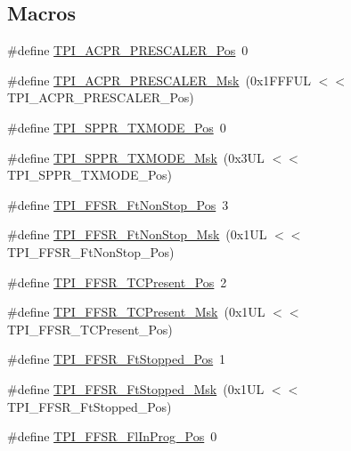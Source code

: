 \subsection*{Macros}
\begin{DoxyCompactItemize}
\item 
\#define \hyperlink{group__CMSIS__TPI_ga5a82d274eb2df8b0c92dd4ed63535928}{T\-P\-I\-\_\-\-A\-C\-P\-R\-\_\-\-P\-R\-E\-S\-C\-A\-L\-E\-R\-\_\-\-Pos}~0
\item 
\#define \hyperlink{group__CMSIS__TPI_ga4fcacd27208419929921aec8457a8c13}{T\-P\-I\-\_\-\-A\-C\-P\-R\-\_\-\-P\-R\-E\-S\-C\-A\-L\-E\-R\-\_\-\-Msk}~(0x1\-F\-F\-F\-U\-L $<$$<$ T\-P\-I\-\_\-\-A\-C\-P\-R\-\_\-\-P\-R\-E\-S\-C\-A\-L\-E\-R\-\_\-\-Pos)
\item 
\#define \hyperlink{group__CMSIS__TPI_ga0f302797b94bb2da24052082ab630858}{T\-P\-I\-\_\-\-S\-P\-P\-R\-\_\-\-T\-X\-M\-O\-D\-E\-\_\-\-Pos}~0
\item 
\#define \hyperlink{group__CMSIS__TPI_gaca085c8a954393d70dbd7240bb02cc1f}{T\-P\-I\-\_\-\-S\-P\-P\-R\-\_\-\-T\-X\-M\-O\-D\-E\-\_\-\-Msk}~(0x3\-U\-L $<$$<$ T\-P\-I\-\_\-\-S\-P\-P\-R\-\_\-\-T\-X\-M\-O\-D\-E\-\_\-\-Pos)
\item 
\#define \hyperlink{group__CMSIS__TPI_ga9537b8a660cc8803f57cbbee320b2fc8}{T\-P\-I\-\_\-\-F\-F\-S\-R\-\_\-\-Ft\-Non\-Stop\-\_\-\-Pos}~3
\item 
\#define \hyperlink{group__CMSIS__TPI_gaaa313f980974a8cfc7dac68c4d805ab1}{T\-P\-I\-\_\-\-F\-F\-S\-R\-\_\-\-Ft\-Non\-Stop\-\_\-\-Msk}~(0x1\-U\-L $<$$<$ T\-P\-I\-\_\-\-F\-F\-S\-R\-\_\-\-Ft\-Non\-Stop\-\_\-\-Pos)
\item 
\#define \hyperlink{group__CMSIS__TPI_gad30fde0c058da2ffb2b0a213be7a1b5c}{T\-P\-I\-\_\-\-F\-F\-S\-R\-\_\-\-T\-C\-Present\-\_\-\-Pos}~2
\item 
\#define \hyperlink{group__CMSIS__TPI_ga0d6bfd263ff2fdec72d6ec9415fb1135}{T\-P\-I\-\_\-\-F\-F\-S\-R\-\_\-\-T\-C\-Present\-\_\-\-Msk}~(0x1\-U\-L $<$$<$ T\-P\-I\-\_\-\-F\-F\-S\-R\-\_\-\-T\-C\-Present\-\_\-\-Pos)
\item 
\#define \hyperlink{group__CMSIS__TPI_gaedf31fd453a878021b542b644e2869d2}{T\-P\-I\-\_\-\-F\-F\-S\-R\-\_\-\-Ft\-Stopped\-\_\-\-Pos}~1
\item 
\#define \hyperlink{group__CMSIS__TPI_ga1ab6c3abe1cf6311ee07e7c479ce5f78}{T\-P\-I\-\_\-\-F\-F\-S\-R\-\_\-\-Ft\-Stopped\-\_\-\-Msk}~(0x1\-U\-L $<$$<$ T\-P\-I\-\_\-\-F\-F\-S\-R\-\_\-\-Ft\-Stopped\-\_\-\-Pos)
\item 
\#define \hyperlink{group__CMSIS__TPI_ga542ca74a081588273e6d5275ba5da6bf}{T\-P\-I\-\_\-\-F\-F\-S\-R\-\_\-\-Fl\-In\-Prog\-\_\-\-Pos}~0
$$
\end{DoxyCompactItemize}
